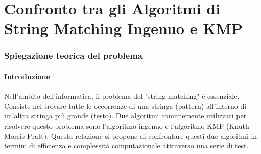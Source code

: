 \part{Confronto tra gli Algoritmi di String Matching Ingenuo e KMP}

\section{Spiegazione teorica del problema}

\subsection{Introduzione}
\label{sec:Introduzione_1}
Nell'ambito dell'informatica, il problema del "string matching" è essenziale. Consiste nel trovare tutte le occorrenze di una stringa (pattern) all'interno di un'altra stringa più grande (testo). Due algoritmi comunemente utilizzati per risolvere questo problema sono l'algoritmo ingenuo e l'algoritmo KMP (Knuth-Morris-Pratt). Questa relazione si propone di confrontare questi due algoritmi in termini di efficienza e complessità computazionale attraverso una serie di test.

